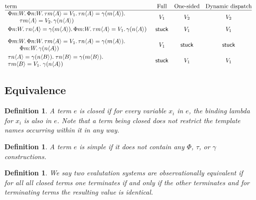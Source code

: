 \documentclass{article}
\newtheorem{definition}[theorem]{Definition}
\begin{document}
\[
\begin{array}{@{}l@{\quad}c@{\quad}c@{\quad}c@{}}
\text{term} & \text{Full} & \text{One-sided} & \text{Dynamic dispatch}\\
\hline
\begin{array}{l}
\Phi m{:}W.\,\Phi n{:}W.\,
\tau m\langle A\rangle=V_1.\,
\tau n\langle A\rangle=\gamma(m\langle A\rangle).\\
\qquad \tau m\langle A\rangle=V_2.\,
\gamma(n\langle A\rangle)
\end{array}
& V_1 & V_2 & V_2
\\[3mm]
\begin{array}{l}
\Phi n{:}W.\,
\tau n\langle A\rangle=\gamma(m\langle A\rangle).\,
\Phi m{:}W.\,
\tau m\langle A\rangle=V_1.\,
\gamma(n\langle A\rangle)
\end{array}
& \mathsf{stuck} & V_1 & V_1
\\[3mm]
\begin{array}{l}
\Phi m{:}W.\,\Phi n{:}W.\,
\tau m\langle A\rangle=V_1.\,
\tau n\langle A\rangle=\gamma(m\langle A\rangle).\\
\qquad \Phi m{:}W.\,
\gamma(n\langle A\rangle)
\end{array}
& V_1 & \mathsf{stuck} & \mathsf{stuck}
\\[3mm]
\begin{array}{l}
\tau n\langle A\rangle=\gamma(n\langle B\rangle).\;
\tau n\langle B\rangle=\gamma(m\langle B\rangle).\\
\tau m\langle B\rangle=V_1.\;
\gamma(n\langle A\rangle)
\end{array}
& \mathsf{stuck} & V_1 & V_1
\end{array}
\]

\subsection{Equivalence}

\begin{definition}
  A term $e$ is closed if for every variable $x_i$ in $e$, the binding lambda for $x_i$ is also in $e$. Note that a term being closed does not restrict the template names occurring within it in any way.
\end{definition}

\begin{definition}
  A term $e$ is simple if it does not contain any $\Phi$, $\tau$, or $\gamma$ constructions.
\end{definition}

\begin{definition}
  We say two evalutation systems are observationally equivalent if for all all closed terms one terminates if and only if the other terminates and for terminating terms the resulting value is identical.
\end{definition}
\end{document}
